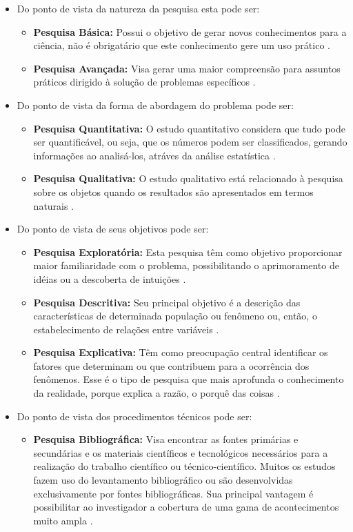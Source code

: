 \begin{itemize}
	\item Do ponto de vista da natureza da pesquisa esta pode ser:
		\begin{itemize}
			\item \textbf{Pesquisa Básica:} Possui o objetivo de gerar novos conhecimentos para a ciência, não é obrigatário que este conhecimento gere um uso prático \cite{Silva:Tafner:2007}.
			\item \textbf{Pesquisa Avançada:} Visa gerar uma maior compreensão para assuntos práticos dirigido à solução de problemas específicos \cite{Silva:Tafner:2007}.
		\end{itemize}

	\item Do ponto de vista da forma de abordagem do problema pode ser:
		\begin{itemize}
			\item \textbf{Pesquisa Quantitativa:} O estudo quantitativo considera que tudo pode ser quantificável, ou seja, que os números podem ser classificados, gerando informações ao analisá-los, atráves da análise estatística \cite{Travassos:2002}.
			\item \textbf{Pesquisa Qualitativa:} O estudo qualitativo está relacionado à pesquisa sobre os objetos quando os resultados são apresentados em termos naturais \cite{Travassos:2002}.
		\end{itemize}

	\item Do ponto de vista de seus objetivos pode ser:
		\begin{itemize}
			\item \textbf{Pesquisa Exploratória:} Esta pesquisa têm como objetivo proporcionar maior familiaridade com o problema, possibilitando o aprimoramento de idéias ou a descoberta de intuições \cite{Gil:2010}.
			\item \textbf{Pesquisa Descritiva:} Seu principal objetivo é a descrição das características de determinada população ou fenômeno ou, então, o estabelecimento de relações entre variáveis \cite{Gil:2010}.
			\item \textbf{Pesquisa Explicativa:} Têm como preocupação central identificar os fatores que determinam ou que contribuem para a ocorrência dos fenômenos. Esse é o tipo de pesquisa que mais aprofunda o conhecimento da realidade, porque explica a razão, o porquê das coisas \cite{Gil:2010}.
		\end{itemize}

	\item Do ponto de vista dos procedimentos técnicos pode ser:
		\begin{itemize}
			\item \textbf{Pesquisa Bibliográfica:} Visa encontrar as fontes primárias e secundárias e os materiais científicos e tecnológicos necessários para a realização do trabalho científico ou técnico-científico. Muitos os estudos fazem uso do levantamento bibliográfico ou são desenvolvidas exclusivamente por fontes bibliográficas. Sua principal vantagem é possibilitar ao investigador a cobertura de uma gama de acontecimentos muito ampla \cite{Silva:Tafner:2007}.


\end{itemize}
\end{itemize}
